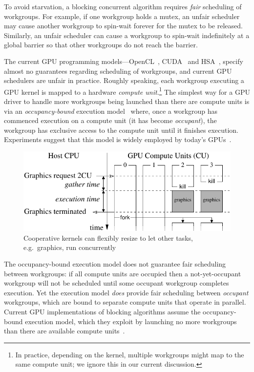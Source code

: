 \documentclass[sigconf]{acmart}
\begin{document}
To avoid starvation, a blocking concurrent algorithm requires
\emph{fair} scheduling of workgroups.  For
example, if one workgroup holds a mutex, an unfair scheduler may cause
another workgroup to spin-wait forever for the mutex to be
released.  Similarly, an unfair scheduler can cause a workgroup to spin-wait
indefinitely at a global barrier so that other workgroups do not reach the barrier.

 The current GPU programming
models---OpenCL~\cite{opencl2Spec}, CUDA~\cite{cuda-75} and
HSA~\cite{HSAprogramming11}, specify almost no guarantees regarding
scheduling of workgroups, and current GPU schedulers are unfair in
practice.  Roughly speaking, each workgroup executing a GPU kernel is
mapped to a hardware \emph{compute unit}.\footnote{In practice,
  depending on the kernel, multiple workgroups might map to the same
  compute unit; we ignore this in our current discussion.}
%
The simplest way for a GPU driver to handle more workgroups being
launched than there are compute units is via an \emph{occupancy-bound}
execution
model~\cite{owens-persistent,DBLP:conf/oopsla/SorensenDBGR16} where,
once a workgroup has commenced execution on a compute unit (it has
become \emph{occupant}), the workgroup has exclusive access to the
compute unit until it finishes execution.
Experiments suggest that this model
is widely employed by today's
GPUs~\cite{owens-persistent,DBLP:conf/oopsla/SorensenDBGR16,DBLP:conf/oopsla/PaiP16,BNP12}.


\begin{figure}[t]
\centering
\includegraphics[width=\columnwidth]{overview.pdf}
\caption{Cooperative kernels can flexibly resize to let other tasks,
e.g.\ graphics, run concurrently}
\label{fig:overview}
\end{figure}

The occupancy-bound execution model does not guarantee fair scheduling
between workgroups: if all compute units are occupied then a
not-yet-occupant workgroup will not be scheduled until some occupant
workgroup completes execution.  Yet the execution model \emph{does}
provide fair scheduling between \emph{occupant} workgroups, which are
bound to separate compute units that operate in parallel.  Current GPU
implementations of blocking algorithms assume the occupancy-bound
execution model, which they exploit by launching no more workgroups
than there are available compute units~\cite{owens-persistent}.
\end{document}
